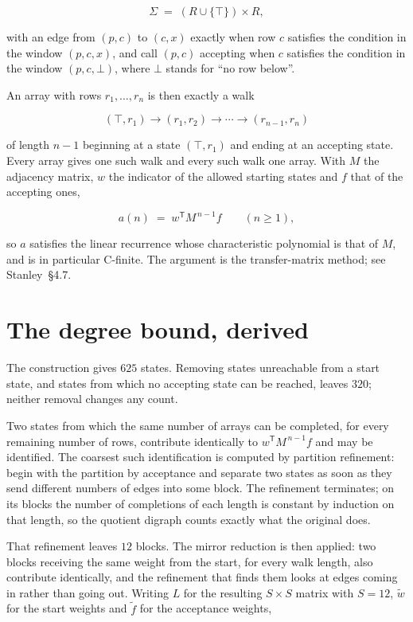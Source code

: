 \documentclass[11pt]{article}
\theoremstyle{definition}
\begin{document}
\[\Sigma \;=\; (R \cup \{\top\}) \times R,\]

with an edge from $(p,c)$ to $(c,x)$ exactly when row $c$ satisfies the condition in the window $(p,c,x)$, and call $(p,c)$ accepting when $c$ satisfies the condition in the window $(p,c,\bot)$, where $\bot$ stands for ``no row below''.

An array with rows $r_1,\dots,r_n$ is then exactly a walk

\[(\top,r_1) \to (r_1,r_2) \to \cdots \to (r_{n-1},r_n)\]

of length $n-1$ beginning at a state $(\top,r_1)$ and ending at an accepting state. Every array gives one such walk and every such walk one array. With $M$ the adjacency matrix, $w$ the indicator of the allowed starting states and $f$ that of the accepting ones,

\[a(n) \;=\; w^{\mathsf T} M^{\,n-1} f \qquad (n \ge 1),\]

so $a$ satisfies the linear recurrence whose characteristic polynomial is that of $M$, and is in particular C-finite. The argument is the transfer-matrix method; see Stanley~\S4.7.

\section{The degree bound, derived}

The construction gives $625$ states. Removing states unreachable from a start state, and states from which no accepting state can be reached, leaves $320$; neither removal changes any count.

Two states from which the same number of arrays can be completed, for every remaining number of rows, contribute identically to $w^{\mathsf T}M^{\,n-1}f$ and may be identified. The coarsest such identification is computed by partition refinement: begin with the partition by acceptance and separate two states as soon as they send different numbers of edges into some block. The refinement terminates; on its blocks the number of completions of each length is constant by induction on that length, so the quotient digraph counts exactly what the original does.

That refinement leaves $12$ blocks. The mirror reduction is then applied: two blocks receiving the same weight from the start, for every walk length, also contribute identically, and the refinement that finds them looks at edges coming in rather than going out. Writing $L$ for the resulting $S \times S$ matrix with $S = 12$, $\tilde w$ for the start weights and $\tilde f$ for the acceptance weights,
\end{document}
